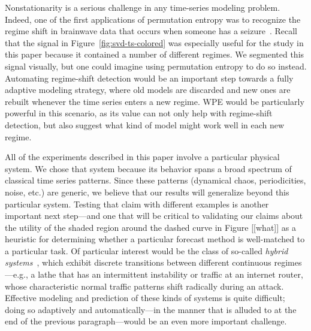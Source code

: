 Nonstationarity is a serious challenge in any time-series modeling
problem.  Indeed, one of the first applications of permutation entropy
was to recognize the regime shift in brainwave data that occurs when
someone has a seizure~\cite{cao2004det}.  Recall that the signal in
Figure~\ref{fig:svd-ts-colored} was especially useful for the study in
this paper because it contained a number of different regimes.  We
segmented this signal visually, but one could imagine using
permutation entropy to do so instead.  Automating regime-shift
detection would be an important step towards a fully adaptive modeling
strategy, where old models are discarded and new ones are rebuilt
whenever the time series enters a new regime.  WPE would be
particularly powerful in this scenario, as its value can not only help
with regime-shift detection, but also suggest what kind of model might
work well in each new regime.

All of the experiments described in this paper involve a particular
physical system.  We chose that system because its behavior spans a
broad spectrum of classical time series patterns.  Since these
patterns (dynamical chaos, periodicities, noise, etc.) are generic, we
believe that our results will generalize beyond this particular
system.  Testing that claim with different examples is another
important next step---and one that will be critical to validating our
claims about the utility of the shaded region around the dashed curve
in Figure [[what]] as a heuristic for determining whether a particular
forecast method is well-matched to a particular task.  Of particular
interest would be the class of so-called \emph{hybrid
  systems}~\cite{hybrid}, which exhibit discrete transitions between
different continuous regimes---e.g., a lathe that has an intermittent
instability or traffic at an internet router, whose characteristic
normal traffic patterns shift radically during an attack.  Effective
modeling and prediction of these kinds of systems is quite difficult;
doing so adaptively and automatically---in the manner that is alluded
to at the end of the previous paragraph---would be an even more
important challenge.

